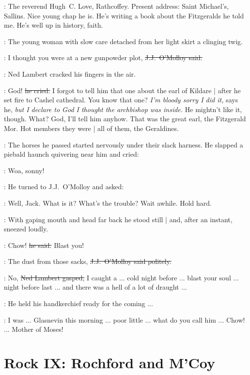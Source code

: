 \lambert:
The reverend Hugh~C. Love, Rathcoffey.
Present address:
Saint Michael's, Sallins.
Nice young chap he is.
He's writing a book about the Fitzgeralds he told me.
He's well up in history, faith.

\begin{mdframed}
    :
    The young woman with slow care
    detached from her light skirt a clinging twig.
\end{mdframed}

\jjom:
I thought you were at a new gunpowder plot,
\sout{J.J.~O'Molloy said.}

:
Ned Lambert cracked his fingers in the air.

\lambert:
God!
\sout{he cried.}
I forgot to tell him that one about the earl of Kildare |
after he set fire to Cashel cathedral.
You know that one?
\emph{I'm bloody sorry I did it,}
says he,
\emph{but I declare to God I thought the archbishop was inside.}
He mightn't like it, though.
What?
God, I'll tell him anyhow.
That was the great earl, the Fitzgerald Mor.
Hot members they were |
all of them, the Geraldines.

:
The horses he passed
started nervously
under their slack harness.
He slapped a piebald haunch quivering near him and cried:

\lambert:
Woa, sonny!

:
He turned to J.J.~O'Molloy and asked:

\lambert:
Well, Jack.
What is it?
What's the trouble?
Wait awhile.
Hold hard.

:
With gaping mouth and head far back
he stood still |
and, after an instant,
sneezed loudly.

\lambert:
Chow!
\sout{he said.}
Blast you!

\jjom:
The dust from those sacks,
\sout{J.J.~O'Molloy said politely.}

\lambert:
No,
\sout{Ned Lambert gasped,}
I caught a ...
cold night before ...
blast your soul ...
night before last ...
and there was a hell of a lot of draught ...

:
He held his handkerchief ready for the coming ...

\lambert:
I was ...
Glasnevin this morning ...
poor little ...
what do you call him ...
Chow! ...
Mother of Moses!


\section*{Rock IX: Rochford and M'Coy}



